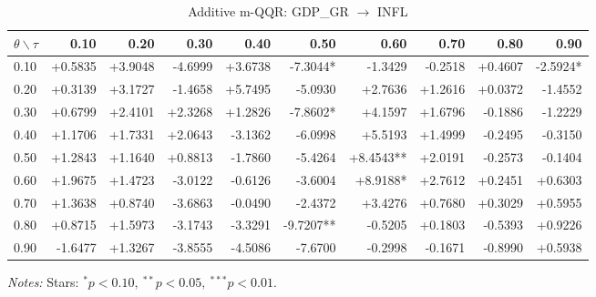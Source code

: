 \begin{table}[!htbp]
  \centering
  \caption{Additive m-QQR: GDP_GR $\to$ INFL}
  \label{tab:amqqr_GDP_GR}
  \begin{tabular}{lrrrrrrrrr}
    \toprule
    $\theta \backslash \tau$ & 0.10 & 0.20 & 0.30 & 0.40 & 0.50 & 0.60 & 0.70 & 0.80 & 0.90 \\
    \midrule
    0.10 & +0.5835 & +3.9048 & -4.6999 & +3.6738 & -7.3044* & -1.3429 & -0.2518 & +0.4607 & -2.5924* \\
    0.20 & +0.3139 & +3.1727 & -1.4658 & +5.7495 & -5.0930 & +2.7636 & +1.2616 & +0.0372 & -1.4552 \\
    0.30 & +0.6799 & +2.4101 & +2.3268 & +1.2826 & -7.8602* & +4.1597 & +1.6796 & -0.1886 & -1.2229 \\
    0.40 & +1.1706 & +1.7331 & +2.0643 & -3.1362 & -6.0998 & +5.5193 & +1.4999 & -0.2495 & -0.3150 \\
    0.50 & +1.2843 & +1.1640 & +0.8813 & -1.7860 & -5.4264 & +8.4543** & +2.0191 & -0.2573 & -0.1404 \\
    0.60 & +1.9675 & +1.4723 & -3.0122 & -0.6126 & -3.6004 & +8.9188* & +2.7612 & +0.2451 & +0.6303 \\
    0.70 & +1.3638 & +0.8740 & -3.6863 & -0.0490 & -2.4372 & +3.4276 & +0.7680 & +0.3029 & +0.5955 \\
    0.80 & +0.8715 & +1.5973 & -3.1743 & -3.3291 & -9.7207** & -0.5205 & +0.1803 & -0.5393 & +0.9226 \\
    0.90 & -1.6477 & +1.3267 & -3.8555 & -4.5086 & -7.6700 & -0.2998 & -0.1671 & -0.8990 & +0.5938 \\
    \bottomrule
  \end{tabular}
  \par\medskip\footnotesize\textit{Notes:} Stars: $^*p<0.10,\ ^{**}p<0.05,\ ^{***}p<0.01$.
\end{table}